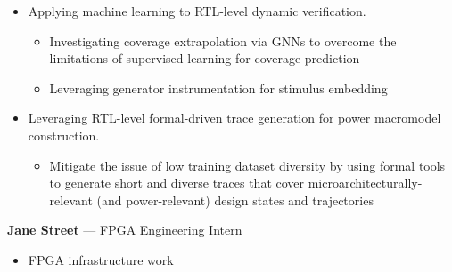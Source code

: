 \documentclass[10pt]{article}
\begin{document}
\begin{itemize}
\begin{itemize}
    \end{itemize}
    \item Applying machine learning to RTL-level dynamic verification.
    \begin{itemize}
        \item Investigating coverage extrapolation via GNNs to overcome the limitations of supervised learning for coverage prediction
        \item Leveraging generator instrumentation for stimulus embedding
    \end{itemize}
    \item Leveraging RTL-level formal-driven trace generation for power macromodel construction.
    \begin{itemize}
        \item Mitigate the issue of low training dataset diversity by using formal tools to generate short and diverse traces that cover microarchitecturally-relevant (and power-relevant) design states and trajectories
    \end{itemize}
\end{itemize}
\vspace{0.2cm}

 \textbf{Jane Street} --- FPGA Engineering Intern
\begin{itemize}
    \item FPGA infrastructure work
\end{itemize}
\vspace{0.2cm}
\end{document}

